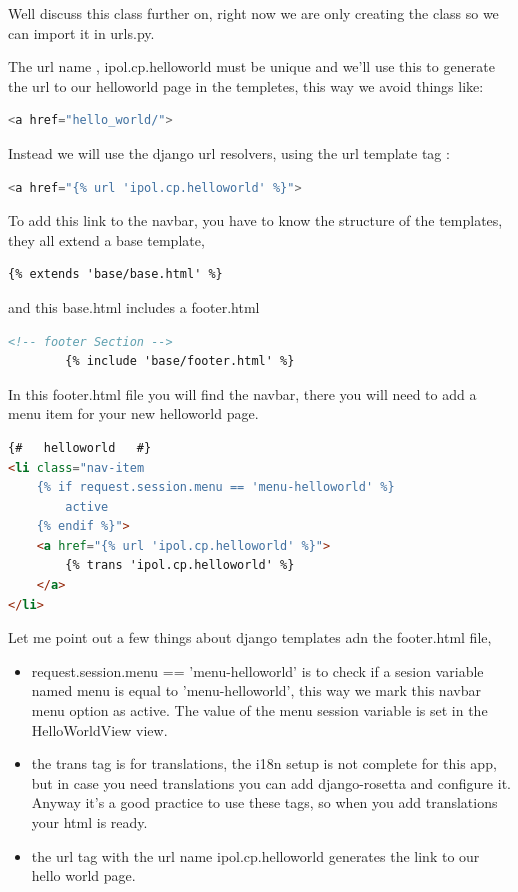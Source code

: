 Well discuss this class further on, right now we are only creating the class so we can import it in urls.py.

The url name , ipol.cp.helloworld must be unique and we'll use this to generate the url to our helloworld page in the templetes, this way we avoid things like: 

\begin{lstlisting}[language=Python,firstnumber=1]
<a href="hello_world/">
\end{lstlisting}

Instead we will use the django url resolvers, using the url template tag :

\begin{lstlisting}[language=Python,firstnumber=1]
<a href="{% url 'ipol.cp.helloworld' %}">
\end{lstlisting}

To add this link to the navbar, you have to know the structure of the templates, they all extend a base template, 

\begin{lstlisting}[language=html,firstnumber=1]
{% extends 'base/base.html' %}
\end{lstlisting}

and this base.html includes a footer.html

\begin{lstlisting}[language=html,firstnumber=1]
        <!-- footer Section -->
        {% include 'base/footer.html' %}
\end{lstlisting}

In this footer.html file you will find the navbar, there you will need to add a menu item for your new helloworld page.

\begin{lstlisting}[language=html,firstnumber=1]
{#   helloworld   #}
<li class="nav-item 
	{% if request.session.menu == 'menu-helloworld' %} 
		active 
	{% endif %}">
	<a href="{% url 'ipol.cp.helloworld' %}">
		{% trans 'ipol.cp.helloworld' %}
	</a>
</li>
\end{lstlisting}

Let me point out a few things about django templates adn the footer.html file, 

\begin{itemize}
\item  request.session.menu == 'menu-helloworld' is to check if a sesion variable named menu
is equal to  'menu-helloworld', this way we mark this navbar menu option as active.
The value of the menu session variable is set in the HelloWorldView view.

\item  the trans tag is for translations, the i18n setup is not complete for this app, but in case you need translations you can add django-rosetta and configure it.
Anyway it's a good practice to use these tags, so when you add translations your html is ready.

\item  the url tag with the url name ipol.cp.helloworld generates the link to our hello world page.

\end{itemize}

